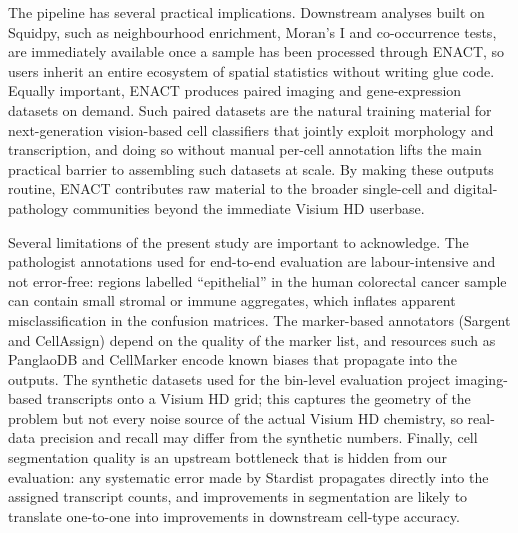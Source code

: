 \documentclass[11pt]{article}
\begin{document}
The pipeline has several practical implications. Downstream analyses built on Squidpy, such as neighbourhood enrichment, Moran's I and co-occurrence tests, are immediately available once a sample has been processed through ENACT, so users inherit an entire ecosystem of spatial statistics without writing glue code. Equally important, ENACT produces paired imaging and gene-expression datasets on demand. Such paired datasets are the natural training material for next-generation vision-based cell classifiers that jointly exploit morphology and transcription, and doing so without manual per-cell annotation lifts the main practical barrier to assembling such datasets at scale. By making these outputs routine, ENACT contributes raw material to the broader single-cell and digital-pathology communities beyond the immediate Visium HD userbase.

Several limitations of the present study are important to acknowledge. The pathologist annotations used for end-to-end evaluation are labour-intensive and not error-free: regions labelled ``epithelial'' in the human colorectal cancer sample can contain small stromal or immune aggregates, which inflates apparent misclassification in the confusion matrices. The marker-based annotators (Sargent and CellAssign) depend on the quality of the marker list, and resources such as PanglaoDB and CellMarker encode known biases that propagate into the outputs. The synthetic datasets used for the bin-level evaluation project imaging-based transcripts onto a Visium HD grid; this captures the geometry of the problem but not every noise source of the actual Visium HD chemistry, so real-data precision and recall may differ from the synthetic numbers. Finally, cell segmentation quality is an upstream bottleneck that is hidden from our evaluation: any systematic error made by Stardist propagates directly into the assigned transcript counts, and improvements in segmentation are likely to translate one-to-one into improvements in downstream cell-type accuracy.
\end{document}
